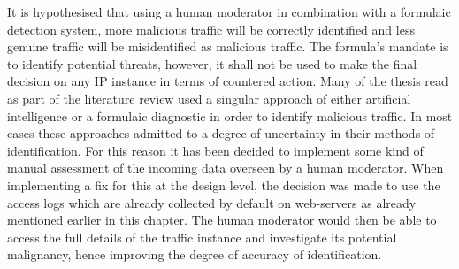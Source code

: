 It is hypothesised that using a human moderator in combination with a formulaic detection system, more malicious traffic will be correctly identified and less genuine traffic will be misidentified as malicious traffic. The formula's mandate is to identify potential threats, however, it shall not be used to make the final decision on any IP instance in terms of countered action. Many of the thesis read as part of the literature review used a singular approach of either artificial intelligence or a formulaic diagnostic in order to identify malicious traffic. In most cases these approaches admitted to a degree of uncertainty in their methods of identification. For this reason it has been decided to implement some kind of manual assessment of the incoming data overseen by a human moderator. When implementing a fix for this at the design level, the decision was made to use the access logs which are already collected by default on web-servers as already mentioned earlier in this chapter. The human moderator would then be able to access the full details of the traffic instance and investigate its potential malignancy, hence improving the degree of accuracy of identification.  

